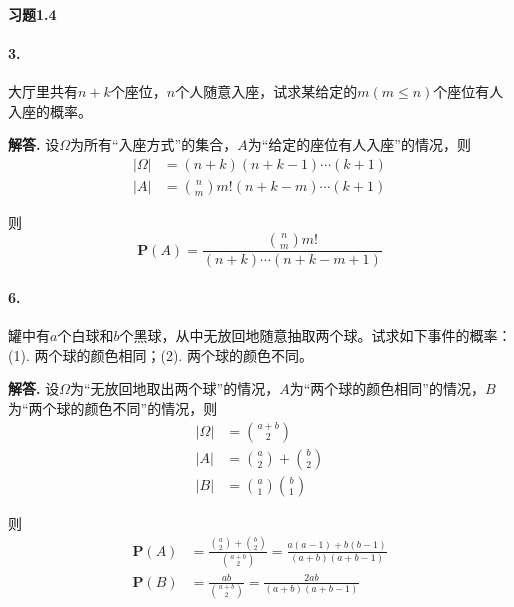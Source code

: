 \documentclass[12pt, a4paper, oneside]{ctexart}
\newenvironment{solution}{\par\noindent\textbf{解答. }}{\bigskip\par}
\begin{document}
\paragraph{习题1.4}
\paragraph{3.}大厅里共有$n+k$个座位，$n$个人随意入座，试求某给定的$m(m\leqslant n)$个座位有人入座的概率。
\begin{solution}
    设$\Omega$为所有“入座方式”的集合，$A$为“给定的座位有人入座”的情况，则
    \begin{equation*}
        \begin{aligned}
            |\Omega| &= (n+k)(n+k-1)\cdots(k+1)\\
            |A| &= \binom{n}{m}m!(n+k-m)\cdots(k+1)
        \end{aligned}
    \end{equation*}
    
    则
    \begin{equation*}
        \textbf{P}(A) = \frac{\binom{n}{m}m!}{(n+k)\cdots(n+k-m+1)}
    \end{equation*}
\end{solution}
\paragraph{6.}罐中有$a$个白球和$b$个黑球，从中无放回地随意抽取两个球。试求如下事件的概率：(1). 两个球的颜色相同；(2). 两个球的颜色不同。
\begin{solution}
    设$\Omega$为“无放回地取出两个球”的情况，$A$为“两个球的颜色相同”的情况，$B$为“两个球的颜色不同”的情况，则
    \begin{equation*}
        \begin{aligned}
            |\Omega|&=\binom{a+b}{2}\\
            |A|&=\binom{a}{2}+\binom{b}{2}\\
            |B|&=\binom{a}{1}\binom{b}{1}
        \end{aligned}
    \end{equation*}
    
    则
    \begin{equation*}
        \begin{aligned}
            \textbf{P}(A) &= \frac{\binom{a}{2}+\binom{b}{2}}{\binom{a+b}{2}}=\frac{a(a-1)+b(b-1)}{(a+b)(a+b-1)}\\
            \textbf{P}(B) &= \frac{ab}{\binom{a+b}{2}} = \frac{2ab}{(a+b)(a+b-1)}
        \end{aligned}
    \end{equation*}
\end{solution}
\end{document}
